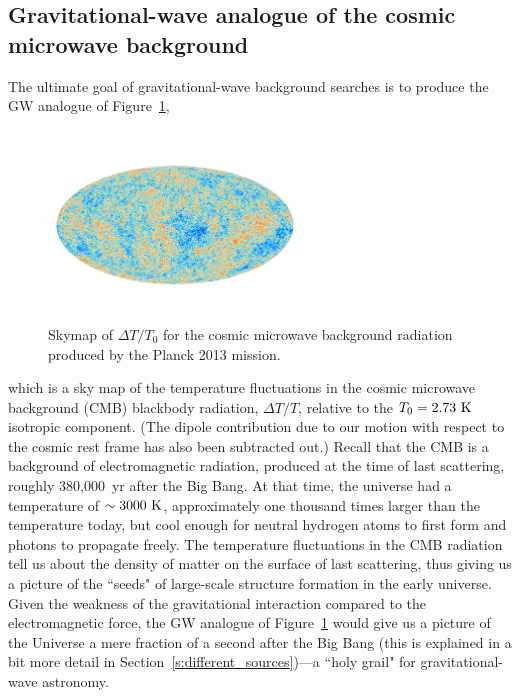 \documentclass[11pt]{article}
\numberwithin{equation}{section}
\begin{document}
\subsection{Gravitational-wave analogue of the cosmic
microwave background}

The ultimate goal of gravitational-wave background
searches is to produce the GW analogue of Figure~\ref{f:CMB},
%
\begin{figure}[htbp!]
\begin{center}
\includegraphics[width=0.6\textwidth]{Figures/CMB}
\caption{Skymap of $\Delta T/T_0$ for the cosmic microwave background
radiation produced by the Planck 2013 mission.}
\label{f:CMB}
\end{center}
\end{figure}
%
which is a sky map of the temperature fluctuations in 
the cosmic microwave background (CMB) 
blackbody radiation, $\Delta T/T$, relative 
to the $T_0 = 2.73~{\rm K}$ isotropic component.
(The dipole contribution due to our motion with respect 
to the cosmic rest frame has also been subtracted out.)
Recall that the CMB is a background of electromagnetic
radiation, produced at the time of last scattering,
roughly 380,000~yr after the Big Bang.
At that time, the universe had a temperature of 
$\sim 3000~{\rm K}$, approximately one thousand times 
larger than the temperature today, but cool enough for 
neutral hydrogen atoms to first form and photons to 
propagate freely.
The temperature fluctuations in the CMB radiation tell
us about the density of matter on the surface of last 
scattering, thus giving us a picture of the ``seeds" of 
large-scale structure formation in the early universe.
Given the weakness of the gravitational interaction 
compared to the electromagnetic force, the GW analogue 
of Figure~\ref{f:CMB} would give us a picture of the 
Universe a mere fraction of a second after the Big
Bang (this is explained in a bit more detail in 
Section~\ref{s:different_sources})---a ``holy grail" 
for gravitational-wave astronomy.
\end{document}
